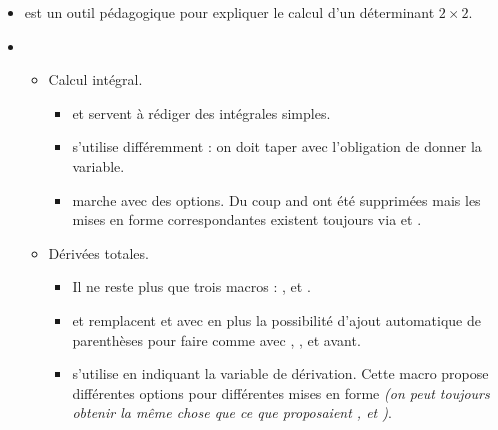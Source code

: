 \documentclass[12pt,a4paper]{book}
\begin{document}
\begin{description}
\begin{itemize}[itemsep=.5em]
    \separation
    \item {}
           est un outil pédagogique pour expliquer le calcul d'un déterminant $2\times2$.




    \separation
    \item {}
    \begin{itemize}[itemsep=.5em]
        \item Calcul intégral.
        
        \begin{itemize}[itemsep=.5em, label=$\rightarrow$]
            \item {} et  servent à rédiger des intégrales simples.

            \item {} s'utilise différemment : on doit taper  avec l'obligation de donner la variable.
            
            \item {} marche avec des options.
                  Du coup  and  ont été supprimées mais les mises en forme correspondantes existent toujours via  et .
	    \end{itemize}
	    
        
        \item Dérivées totales.
        
        \begin{itemize}[itemsep=.5em, label=$\rightarrow$]
            \item Il ne reste plus que trois macros : ,  et .

            \item {} et  remplacent  et  avec en plus la possibilité d'ajout automatique de parenthèses pour faire comme avec , ,  et  avant.


            \item {} s'utilise en indiquant la variable de dérivation. Cette macro propose différentes options pour différentes mises en forme 
                  \emph{(on peut toujours obtenir la même chose que ce que proposaient ,  et )}.


\end{itemize}
\end{itemize}
\end{itemize}
\end{description}
\end{document}
